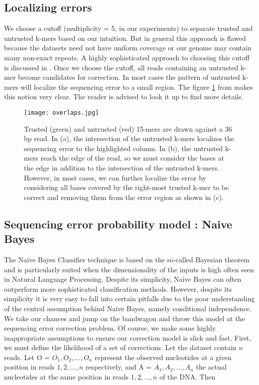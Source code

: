 \documentclass[11pt]{article}
\begin{document}
\subsection{Localizing errors}
We choose a cutoff (multiplicity = 5, in our experiments) to separate trusted and untrusted k-mers based on our intuition. But in general this approach is flawed because the datasets need not have uniform coverage or our genome  may contain many non-exact repeats. A highly sophisticated approach to choosing this cutoff is discussed in \cite{chikhi,quake}. Once we choose the cutoff, all reads containing an untrusted k-mer become candidates for correction. In most cases the pattern of untrusted k-mers will localize the sequencing error to a small region. The figure \ref{lc} from \cite{quake} makes this notion very clear. The reader is advised to look it up to find more details.
\begin{figure}[ht!]
\centering
\texttt{[image: overlaps.jpg]}
\caption{\tiny{Trusted (green) and untrusted (red) 15-mers are drawn against a 36 bp read. In (a), the intersection of the untrusted k-mers localizes the sequencing error to the highlighted column. In (b), the untrusted k-mers reach the edge of the read, so we must consider the bases at the edge in addition to the intersection of the untrusted k-mers. However, in most cases, we can further localize the error by considering all bases covered by the right-most trusted k-mer to be correct and removing them from the error region as shown in (c). }}
\label{lc}
\end{figure} 

\subsection{Sequencing error probability model : Naive Bayes}
The Naive Bayes Classifier technique is based on the so-called Bayesian theorem and is particularly suited when the dimensionality of the inputs is high often seen in Natural Language Processing. Despite its simplicity, Naive Bayes can often outperform more sophisticated classification methods. However, despite its simplicity it is very easy to fall into certain pitfalls due to the poor understanding of the central assumption behind Naive Bayes, namely conditional independence. We take our chances and jump on the bandwagon and throw this model at the sequencing error correction problem. Of course, we make some highly inappropriate assumptions to ensure our correction model is slick and fast. First, we must define the likelihood of a set of corrections. Let the dataset contain $n$ reads.  Let O = $O_1, O_2,..., O_n$ represent the observed nucleotides at a given position in reads $1, 2,..., n$ respectively, and A = $A_1, A_2,..., A_n$ the actual nucleotides at the same position in reads $1, 2,..., n$ of the DNA. Then 
\end{document}
